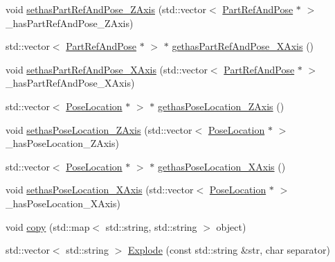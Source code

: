 \begin{DoxyCompactItemize}
\item 
void \hyperlink{class_vector_a5aa52131cbf729fa4ffea4fcd01cbd30}{sethasPartRefAndPose\_\-ZAxis} (std::vector$<$ \hyperlink{class_part_ref_and_pose}{PartRefAndPose} $\ast$ $>$ \_\-hasPartRefAndPose\_\-ZAxis)
\item 
std::vector$<$ \hyperlink{class_part_ref_and_pose}{PartRefAndPose} $\ast$ $>$ $\ast$ \hyperlink{class_vector_abff0c8b95ea4a9d6d56a66a6d27761b9}{gethasPartRefAndPose\_\-XAxis} ()
\item 
void \hyperlink{class_vector_a87d502c82ea0bc7fe74537787c475936}{sethasPartRefAndPose\_\-XAxis} (std::vector$<$ \hyperlink{class_part_ref_and_pose}{PartRefAndPose} $\ast$ $>$ \_\-hasPartRefAndPose\_\-XAxis)
\item 
std::vector$<$ \hyperlink{class_pose_location}{PoseLocation} $\ast$ $>$ $\ast$ \hyperlink{class_vector_aa10dcdf665e5fc6f85a71a4157c228f5}{gethasPoseLocation\_\-ZAxis} ()
\item 
void \hyperlink{class_vector_aa5851b8d355dd8da0cba59409e15900f}{sethasPoseLocation\_\-ZAxis} (std::vector$<$ \hyperlink{class_pose_location}{PoseLocation} $\ast$ $>$ \_\-hasPoseLocation\_\-ZAxis)
\item 
std::vector$<$ \hyperlink{class_pose_location}{PoseLocation} $\ast$ $>$ $\ast$ \hyperlink{class_vector_a3cc100bdfd4afa077b75ea5a7dd21541}{gethasPoseLocation\_\-XAxis} ()
\item 
void \hyperlink{class_vector_ade75a6e9a786cf9f1921dc36ee1e38ce}{sethasPoseLocation\_\-XAxis} (std::vector$<$ \hyperlink{class_pose_location}{PoseLocation} $\ast$ $>$ \_\-hasPoseLocation\_\-XAxis)
\item 
void \hyperlink{class_vector_ac052b5dd3cd960245f52733d724916f6}{copy} (std::map$<$ std::string, std::string $>$ object)
\item 
std::vector$<$ std::string $>$ \hyperlink{class_vector_a4be54f9589fd877120fbf0c9b799eb44}{Explode} (const std::string \&str, char separator)
\end{DoxyCompactItemize}


